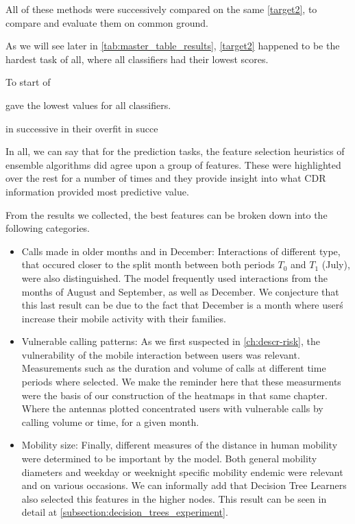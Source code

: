 All of these methods were successively compared on the same \cref{target2}, to compare and evaluate them on common ground.

As we will see later in \cref{tab:master_table_results}, \cref{target2} happened to be the hardest task of all, where all classifiers had their lowest scores.

To start of

 gave the lowest values for all classifiers.

in successive
in their overfit
 in succe








In all, we can say that for the prediction tasks, the feature selection heuristics of ensemble algorithms did agree upon a group of features.
These were highlighted over the rest for a number of times and they provide insight into what CDR information provided most
predictive value.

From the results we collected, the best features can be broken down into the following categories.

\begin{itemize}

    \item Calls made in older months and in December: Interactions of different type, that occured closer to the split month between both periods $T_0$ and $T_1$ (July), were also distinguished.
    The model frequently used interactions from the months of August and September, as well as December.
    We conjecture that this last result can be due to the fact that December is a month where user\'s increase their mobile activity with their families.

    \item Vulnerable calling patterns: As we first suspected in \cref{ch:descr-risk}, the vulnerability of the mobile interaction between users was relevant.
    Measurements such as the duration and volume of calls at different time periods where selected.
    We make the reminder here that these measurments were the basis of our construction of the heatmaps in that same chapter.
    Where the antennas plotted concentrated users with vulnerable calls by calling volume or time, for a given month.

    \item Mobility size: Finally, different measures of the distance in human mobility were determined to be important by the model. Both general mobility diameters and weekday or weeknight specific mobility endemic were relevant and on various occasions.
    We can informally add that Decision Tree Learners also selected this features in the higher nodes.
    This result can be seen in detail at \cref{subsection:decision_trees_experiment}.

\end{itemize}

